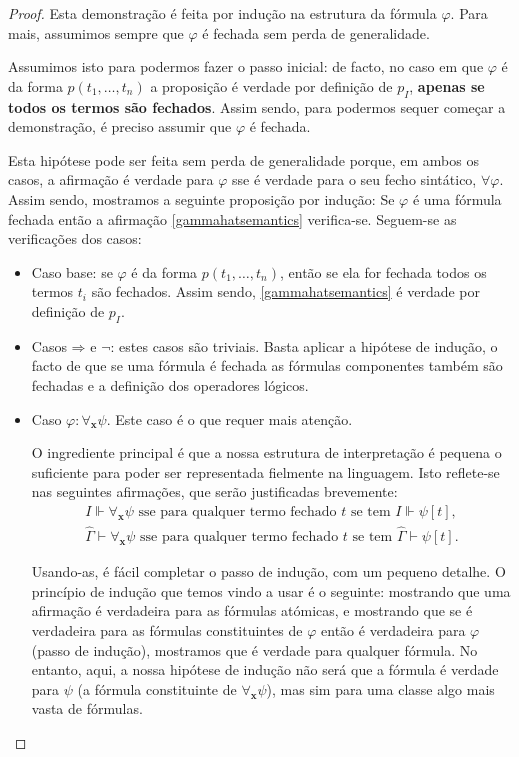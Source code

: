 \documentclass{report}
\theoremstyle{definition}
\theoremstyle{remark}
\renewcommand{\bf}[1]{\mathbf{#1}}
\newcommand{\imply}{\mathbin{\Rightarrow}}
\begin{document}
	\begin{proof}
	Esta demonstração é feita por indução na estrutura da fórmula $\varphi$. Para mais, assumimos sempre que $\varphi$ é fechada sem perda de generalidade.
	
	Assumimos isto para podermos fazer o passo inicial: de facto, no caso em que $\varphi$ é da forma $p(t_1, \dots, t_n)$ a proposição é verdade por definição de $p_I$, \textbf{apenas se todos os termos são fechados}. Assim sendo, para podermos sequer começar a demonstração, é preciso assumir que $\varphi$ é fechada.
	
	Esta hipótese pode ser feita sem perda de generalidade porque, em ambos os casos, a afirmação é verdade para $\varphi$ sse é verdade para o seu fecho sintático, $\forall \varphi$. Assim sendo, mostramos a seguinte proposição por indução: Se $\varphi$ é uma fórmula fechada então a afirmação \eqref{gammahatsemantics} verifica-se. Seguem-se as verificações dos casos:
	
	\begin{itemize}
	\item Caso base: se $\varphi$ é da forma $p(t_1, \dots, t_n)$, então se ela for fechada todos os termos $t_i$ são fechados. Assim sendo, \eqref{gammahatsemantics} é verdade por definição de $p_I$.
	
	\item Casos $\imply$ e $\neg$: estes casos são triviais. Basta aplicar a hipótese de indução, o facto de que se uma fórmula é fechada as fórmulas componentes também são fechadas e a definição dos operadores lógicos.
	
	\item Caso $\varphi : \forall_{\bf x} \psi$. Este caso é o que requer mais atenção.
	
	O ingrediente principal é que a nossa estrutura de interpretação é pequena o suficiente para poder ser representada fielmente na linguagem. Isto reflete-se nas seguintes afirmações, que serão justificadas brevemente:
\begin{gather}
I \Vdash \forall_{\bf x} \psi \text{ sse para qualquer termo fechado $t$ se tem } I \Vdash \psi[t],\label{eq:smallstructure1}\\
\widehat\Gamma \vdash \forall_{\bf x} \psi \text{ sse para qualquer termo fechado $t$ se tem } \widehat\Gamma \vdash \psi[t].\label{eq:smallstructure2}
\end{gather}

	Usando-as, é fácil completar o passo de indução, com um pequeno detalhe. O princípio de indução que temos vindo a usar é o seguinte: mostrando que uma afirmação é verdadeira para as fórmulas atómicas, e mostrando que se é verdadeira para as fórmulas constituintes de $\varphi$ então é verdadeira para $\varphi$ (passo de indução), mostramos que é verdade para qualquer fórmula. No entanto, aqui, a nossa hipótese de indução não será que a fórmula é verdade para $\psi$ (a fórmula constituinte de $\forall_{\bf x} \psi$), mas sim para uma classe algo mais vasta de fórmulas.


\end{itemize}
\end{proof}
\end{document}
